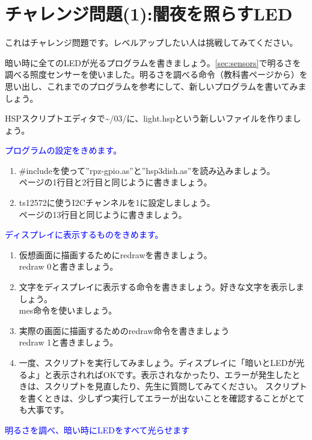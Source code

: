 \section{チャレンジ問題(1):闇夜を照らすLED}
これはチャレンジ問題です。レベルアップしたい人は挑戦してみてください。

暗い時に全てのLEDが光るプログラムを書きましょう。\ref{sec:sensors}で明るさを調べる照度センサーを使いました。明るさを調べる命令（教科書\pageref{sec:sensors}ページから）を思い出し、これまでのプログラムを参考にして、新しいプログラムを書いてみましょう。\\
\begin{enumerate}
\renewcommand{\theenumii}{\arabic{enumii}}
\renewcommand{\labelenumii}{\theenumi.\theenumii}
\item HSPスクリプトエディタで\textasciitilde /03/に、light.hspという新しいファイルを作りましょう。
\textcolor{blue}{\item プログラムの設定をきめます。}
\begin{enumerate}
\item \#includeを使って”rpz-gpio.as”と”hsp3dish.as”を読み込みましょう。\\
\pageref{sensors.hsp}ページの1行目と2行目と同じように書きましょう。
\item ts12572に使うI2Cチャンネルを1に設定しましょう。\\
\pageref{sensors.hsp}ページの13行目と同じように書きましょう。
\end{enumerate}
\textcolor{blue}{\item ディスプレイに表示するものをきめます。}
\begin{enumerate}
\item 仮想画面に描画するためにredrawを書きましょう。\\
redraw 0と書きましょう。
\item 文字をディスプレイに表示する命令を書きましょう。好きな文字を表示しましょう。\\
mes命令を使いましょう。
\item 実際の画面に描画するためのredraw命令を書きましょう\\
redraw 1と書きましょう。
\item 一度、スクリプトを実行してみましょう。ディスプレイに「暗いとLEDが光るよ」と表示されればOKです。表示されなかったり、エラーが発生したときは、スクリプトを見直したり、先生に質問してみてください。
スクリプトを書くときは、少しずつ実行してエラーが出ないことを確認することがとても大事です。
\end{enumerate}
\textcolor{blue}{\item 明るさを調べ、暗い時にLEDをすべて光らせます}

\end{enumerate}
